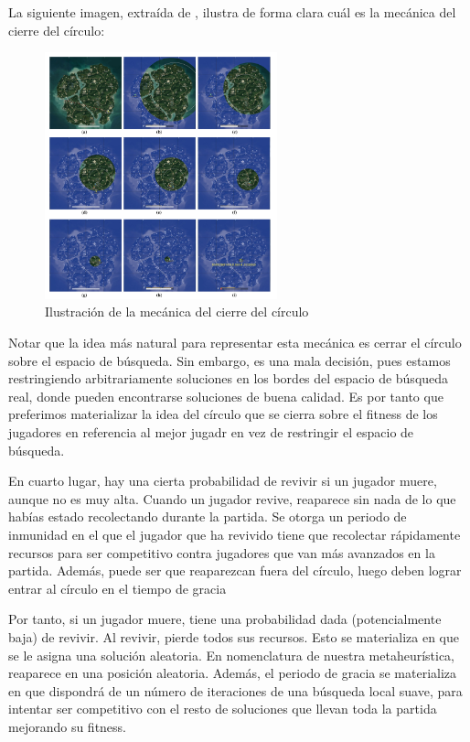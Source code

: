 \documentclass[11pt]{article}
\begin{document}
La siguiente imagen, extraída de \cite{other_paper:paper}, ilustra de forma clara cuál es la mecánica del cierre del círculo:

\begin{figure}[H]
    \centering
    \includegraphics[width=0.6\textwidth]{cierre_circulo}
    \caption{Ilustración de la mecánica del cierre del círculo}
\end{figure}

Notar que la idea más natural para representar esta mecánica es cerrar el círculo sobre el espacio de búsqueda. Sin embargo, es una mala decisión, pues estamos restringiendo arbitrariamente soluciones en los bordes del espacio de búsqueda real, donde pueden encontrarse soluciones de buena calidad. Es por tanto que preferimos materializar la idea del círculo que se cierra sobre el fitness de los jugadores en referencia al mejor jugadr en vez de restringir el espacio de búsqueda.

En cuarto lugar, hay una cierta probabilidad de revivir si un jugador muere, aunque no es muy alta. Cuando un jugador revive, reaparece sin nada de lo que habías estado recolectando durante la partida. Se otorga un periodo de inmunidad en el que el jugador que ha revivido tiene que recolectar rápidamente recursos para ser competitivo contra jugadores que van más avanzados en la partida. Además, puede ser que reaparezcan fuera del círculo, luego deben lograr entrar al círculo en el tiempo de gracia

Por tanto, si un jugador muere, tiene una probabilidad dada (potencialmente baja) de revivir. Al revivir, pierde todos sus recursos. Esto se materializa en que se le asigna una solución aleatoria. En nomenclatura de nuestra metaheurística, reaparece en una posición aleatoria. Además, el periodo de gracia se materializa en que dispondrá de un número de iteraciones de una búsqueda local suave,  para intentar ser competitivo con el resto de soluciones que llevan toda la partida mejorando su fitness.
\end{document}
